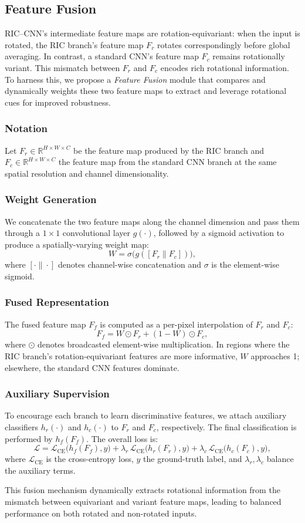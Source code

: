 \subsection{Feature Fusion}

RIC–CNN’s intermediate feature maps are rotation-equivariant: when the input is rotated, the RIC branch’s feature map $F_r$ rotates correspondingly before global averaging. In contrast, a standard CNN’s feature map $F_c$ remains rotationally variant. This mismatch between $F_r$ and $F_c$ encodes rich rotational information. To harness this, we propose a \emph{Feature Fusion} module that compares and dynamically weights these two feature maps to extract and leverage rotational cues for improved robustness.

\subsubsection{Notation}
Let $F_r\in\mathbb{R}^{H\times W\times C}$ be the feature map produced by the RIC branch and $F_c\in\mathbb{R}^{H\times W\times C}$ the feature map from the standard CNN branch at the same spatial resolution and channel dimensionality.

\subsubsection{Weight Generation}
We concatenate the two feature maps along the channel dimension and pass them through a $1\times1$ convolutional layer $g(\cdot)$, followed by a sigmoid activation to produce a spatially-varying weight map:
\[
W = \sigma\bigl(g([F_r \| F_c])\bigr),
\]
where $[\cdot\|\cdot]$ denotes channel-wise concatenation and $\sigma$ is the element-wise sigmoid.

\subsubsection{Fused Representation}
The fused feature map $F_f$ is computed as a per-pixel interpolation of $F_r$ and $F_c$:
\[
F_f = W \odot F_r + (1 - W) \odot F_c,
\]
where $\odot$ denotes broadcasted element-wise multiplication. In regions where the RIC branch’s rotation-equivariant features are more informative, $W$ approaches 1; elsewhere, the standard CNN features dominate.

\subsubsection{Auxiliary Supervision}
To encourage each branch to learn discriminative features, we attach auxiliary classifiers $h_r(\cdot)$ and $h_c(\cdot)$ to $F_r$ and $F_c$, respectively. The final classification is performed by $h_f(F_f)$. The overall loss is:
\[
\mathcal{L} = \mathcal{L}_{\mathrm{CE}}\bigl(h_f(F_f), y\bigr) + \lambda_r \, \mathcal{L}_{\mathrm{CE}}\bigl(h_r(F_r), y\bigr) + \lambda_c \, \mathcal{L}_{\mathrm{CE}}\bigl(h_c(F_c), y\bigr),
\]
where $\mathcal{L}_{\mathrm{CE}}$ is the cross-entropy loss, $y$ the ground-truth label, and $\lambda_r,\lambda_c$ balance the auxiliary terms.

This fusion mechanism dynamically extracts rotational information from the mismatch between equivariant and variant feature maps, leading to balanced performance on both rotated and non-rotated inputs.